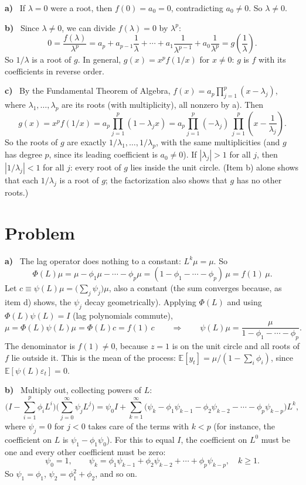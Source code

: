 \documentclass[11pt]{article}
\newcommand{\E}{\mathbb{E}}
\newcounter{problem}
\renewcommand{\theproblem}{\arabic{problem}}
\newcommand{\problem}{
	\stepcounter{problem}
	\section*{Problem \theproblem}
}
\newcommand{\itm}[1]{\par\textbf{#1)}\ }
\begin{document}
\itm{a}
If $\lambda=0$ were a root, then $f(0) = a_0 = 0$, contradicting $a_0\neq0$. So $\lambda\neq0$.

\itm{b}
Since $\lambda\neq0$, we can divide $f(\lambda)=0$ by $\lambda^p$:
\[
0 = \frac{f(\lambda)}{\lambda^p} = a_p + a_{p-1}\frac1\lambda + \cdots + a_1\frac1{\lambda^{p-1}} + a_0\frac1{\lambda^p} = g\!\left(\frac1\lambda\right).
\]
So $1/\lambda$ is a root of $g$. In general, $g(x) = x^pf(1/x)$ for $x\ne0$: $g$ is $f$ with its coefficients in reverse order.

\itm{c}
By the Fundamental Theorem of Algebra, $f(x) = a_p\prod_{j=1}^p(x-\lambda_j)$, where $\lambda_1,\dots,\lambda_p$ are its roots (with multiplicity), all nonzero by a). Then
\[
g(x) = x^pf(1/x) = a_p\prod_{j=1}^p(1-\lambda_jx) = a_p\prod_{j=1}^p(-\lambda_j)\,\prod_{j=1}^p\left(x-\frac1{\lambda_j}\right).
\]
So the roots of $g$ are exactly $1/\lambda_1,\dots,1/\lambda_p$, with the same multiplicities (and $g$ has degree $p$, since its leading coefficient is $a_0\neq0$). If $|\lambda_j|>1$ for all $j$, then $|1/\lambda_j|<1$ for all $j$: every root of $g$ lies inside the unit circle. (Item b) alone shows that each $1/\lambda_j$ is a root of $g$; the factorization also shows that $g$ has no other roots.)

\problem

\itm{a}
The lag operator does nothing to a constant: $L^k\mu=\mu$. So
\[
\Phi(L)\mu = \mu-\phi_1\mu-\cdots-\phi_p\mu = (1-\phi_1-\cdots-\phi_p)\,\mu = f(1)\,\mu .
\]
Let $c\equiv\psi(L)\mu = \big(\sum_j\psi_j\big)\mu$, also a constant (the sum converges because, as item d) shows, the $\psi_j$ decay geometrically). Applying $\Phi(L)$ and using $\Phi(L)\psi(L)=I$ (lag polynomials commute),
\[
\mu = \Phi(L)\psi(L)\mu = \Phi(L)c = f(1)\,c
\qquad\Longrightarrow\qquad
\psi(L)\mu = \frac{\mu}{1-\phi_1-\cdots-\phi_p}.
\]
The denominator is $f(1)\neq0$, because $z=1$ is on the unit circle and all roots of $f$ lie outside it. This is the mean of the process: $\E[y_t] = \mu/(1-\sum_i\phi_i)$, since $\E[\psi(L)\varepsilon_t]=0$.

\itm{b}
Multiply out, collecting powers of $L$:
\[
\Big(I-\sum_{i=1}^p\phi_iL^i\Big)\Big(\sum_{j=0}^\infty\psi_jL^j\Big)
= \psi_0 I + \sum_{k=1}^\infty\Big(\psi_k - \phi_1\psi_{k-1}-\phi_2\psi_{k-2}-\cdots-\phi_p\psi_{k-p}\Big)L^k,
\]
where $\psi_j=0$ for $j<0$ takes care of the terms with $k<p$ (for instance, the coefficient on $L$ is $\psi_1-\phi_1\psi_0$). For this to equal $I$, the coefficient on $L^0$ must be one and every other coefficient must be zero:
\[
\psi_0 = 1,\qquad \psi_k = \phi_1\psi_{k-1}+\phi_2\psi_{k-2}+\cdots+\phi_p\psi_{k-p},\quad k\ge1 .
\]
So $\psi_1=\phi_1$, $\psi_2=\phi_1^2+\phi_2$, and so on.
\end{document}
